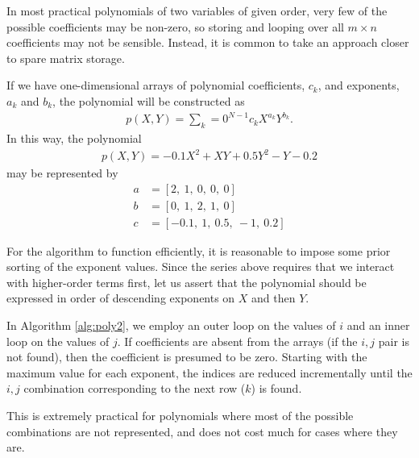 \documentclass[letterpaper,11pt]{article}
\begin{document}
In most practical polynomials of two variables of given order, very few of the possible coefficients may be non-zero, so storing and looping over all $m\times n$ coefficients may not be sensible.  Instead, it is common to take an approach closer to spare matrix storage.

If we have one-dimensional arrays of polynomial coefficients, $c_k$, and exponents, $a_k$ and $b_k$, the polynomial will be constructed as
\begin{align}
p(X,Y) = \sum_k=0^{N-1} c_k X^{a_k} Y^{b_k}.
\end{align}
In this way, the polynomial
\begin{align}
p(X,Y) = -0.1 X^2 + XY + 0.5 Y^2 - Y - 0.2
\end{align}
may be represented by
\begin{align}
a &= \left[ 2,\ 1,\ 0,\ 0,\ 0\right]\\
b &= \left[ 0,\ 1,\ 2,\ 1,\ 0\right]\\
c &= \left[ -0.1,\ 1,\ 0.5,\ -1,\ 0.2\right]
\end{align}

For the algorithm to function efficiently, it is reasonable to impose some prior sorting of the exponent values.  Since the series above requires that we interact with higher-order terms first, let us assert that the polynomial should be expressed in order of descending exponents on $X$ and then $Y$.

In Algorithm \ref{alg:poly2}, we employ an outer loop on the values of $i$ and an inner loop on the values of $j$.  If coefficients are absent from the arrays (if the $i,j$ pair is not found), then the coefficient is presumed to be zero.  Starting with the maximum value for each exponent, the indices are reduced incrementally until the $i,j$ combination corresponding to the next row ($k$) is found.

This is extremely practical for polynomials where most of the possible combinations are not represented, and does not cost much for cases where they are.
\end{document}
